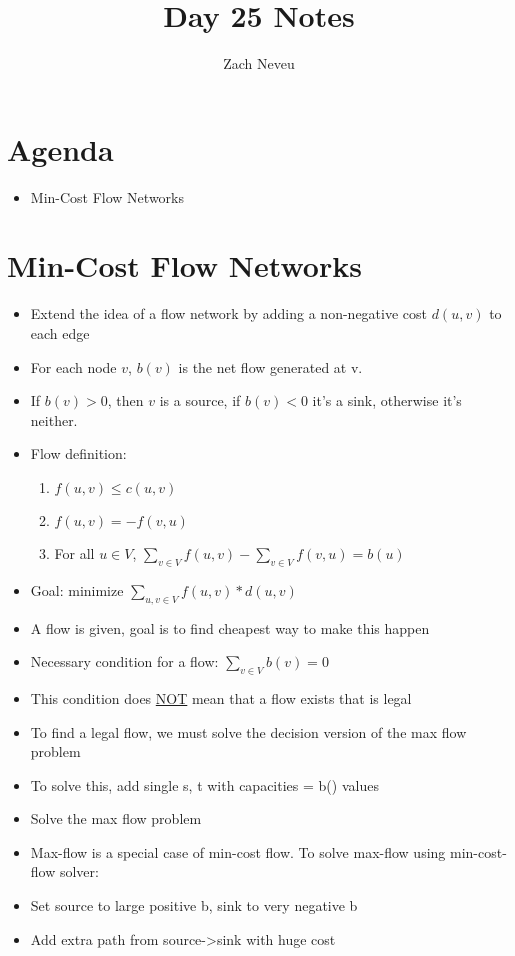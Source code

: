 \documentclass[12pt, letter]{article}
\author{Zach Neveu}
\title{ Day 25 Notes }
\begin{document}
\maketitle

\section{Agenda}%
\begin{itemize}
	\item Min-Cost Flow Networks
\end{itemize}

\section{Min-Cost Flow Networks}%
\begin{itemize}
	\item Extend the idea of a flow network by adding a non-negative cost $d(u,v)$ to each edge
	\item For each node $v$, $b(v)$ is the net flow generated at v.
	\item If $b(v) > 0$, then $v$ is a source, if $b(v) < 0$ it's a sink, otherwise it's neither.
	\item Flow definition:
	\begin{enumerate}
		\item $f(u,v) \le c(u,v)$
		\item $f(u,v) = -f(v,u)$
		\item For all $u \in V$,  $\sum_{v\in V} f(u,v) - \sum_{v\in V} f(v,u) = b(u)$
	\end{enumerate}
	\item Goal: minimize  $\sum_{u,v \in V} f(u,v)*d(u,v)$
	\item A flow is given, goal is to find cheapest way to make this happen
	\item Necessary condition for a flow: $\sum_{v \in V} b(v) = 0$
	\item This condition does \underline{NOT} mean that a flow exists that is legal
	\item To find a legal flow, we must solve the decision version of the max flow problem
	\item To solve this, add single s, t with capacities = b() values
	\item Solve the max flow problem
	\item Max-flow is a special case of min-cost flow. To solve max-flow using min-cost-flow solver:
	\item Set source to large positive b, sink to very negative b
	\item Add extra path from source->sink with huge cost
\end{itemize}
\end{document}
